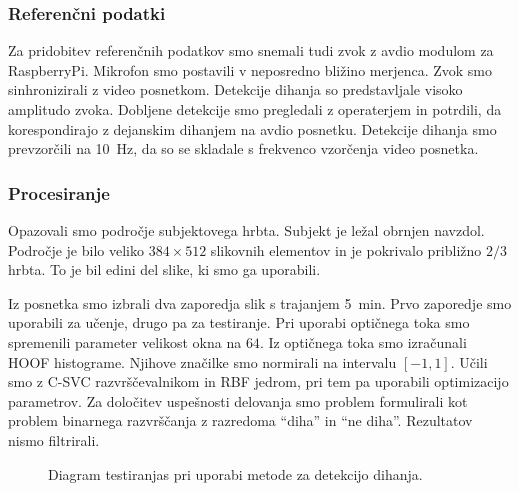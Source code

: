 \subsubsection{Referenčni podatki}
Za pridobitev referenčnih podatkov smo snemali tudi zvok z avdio modulom za RaspberryPi. Mikrofon smo postavili v neposredno bližino merjenca. Zvok smo sinhronizirali z video posnetkom. Detekcije dihanja so predstavljale visoko amplitudo zvoka. Dobljene detekcije smo pregledali z operaterjem in potrdili, da korespondirajo z dejanskim dihanjem na avdio posnetku. Detekcije dihanja smo prevzorčili na \SI{10}{Hz}, da so se skladale s frekvenco vzorčenja video posnetka.

\subsubsection{Procesiranje}\label{sec:data-preprocessing}
Opazovali smo področje subjektovega hrbta. Subjekt je ležal obrnjen navzdol. Področje je bilo veliko $384 \times 512$ slikovnih elementov in je pokrivalo približno $2/3$ hrbta. To je bil edini del slike, ki smo ga uporabili.

Iz posnetka smo izbrali dva zaporedja slik s trajanjem \SI{5}{min}. Prvo zaporedje smo uporabili za učenje, drugo pa za testiranje. Pri uporabi optičnega toka smo spremenili parameter velikost okna na $64$. Iz optičnega toka smo izračunali HOOF histograme. Njihove značilke smo normirali na intervalu $[-1,1]$. Učili smo z C-SVC razvrščevalnikom in RBF jedrom, pri tem pa uporabili optimizacijo parametrov. Za določitev uspešnosti delovanja smo problem formulirali kot problem binarnega razvrščanja z razredoma ``diha'' in ``ne diha''. Rezultatov nismo filtrirali.

\begin{figure}[htb]
	\centering
	\resizebox{\columnwidth}{!}{}
	\caption[Diagram testiranja pri uporabi metode za detekcijo dihanja]{Diagram testiranjas pri uporabi metode za detekcijo dihanja.}
	\label{fig:dihanje-postopek}
\end{figure}

